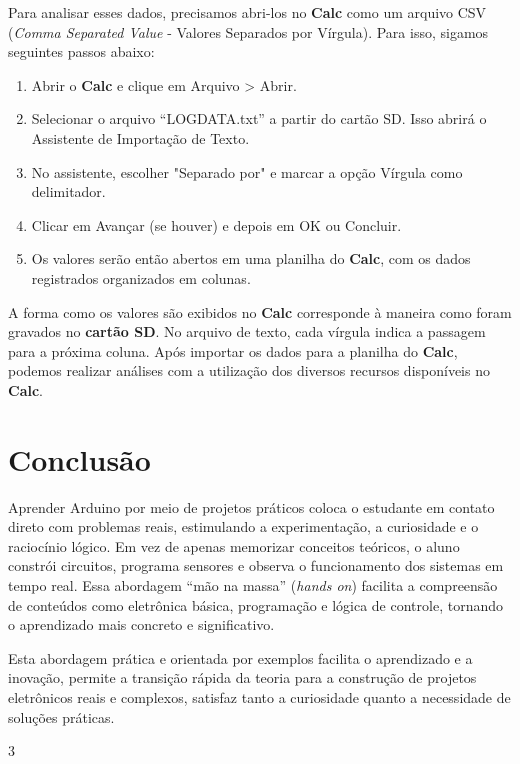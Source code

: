 \documentclass[a4paper,11pt]{article}
\begin{document}
Para analisar esses dados, precisamos abri-los no \textbf{Calc} como um arquivo CSV (\textit{Comma Separated Value} - Valores Separados por Vírgula). Para isso, sigamos seguintes passos abaixo:
\begin{enumerate}
  \item Abrir o \textbf{Calc} e clique em Arquivo > Abrir. 
  \item Selecionar o arquivo “LOGDATA.txt” a partir do cartão SD. Isso abrirá o Assistente de Importação de Texto.
  \item No assistente, escolher "Separado por" e marcar a opção Vírgula como delimitador. 
  \item Clicar em Avançar (se houver) e depois em OK ou Concluir.
  \item Os valores serão então abertos em uma planilha do \textbf{Calc}, com os dados registrados organizados em colunas.
\end{enumerate}

A forma como os valores são exibidos no \textbf{Calc} corresponde à maneira como foram gravados no \textbf{cartão SD}. No arquivo de texto, cada vírgula indica a passagem para a próxima coluna. Após importar os dados para a planilha do \textbf{Calc}, podemos realizar análises com a utilização dos diversos recursos disponíveis no \textbf{Calc}.

\section{Conclusão}
Aprender Arduino por meio de projetos práticos coloca o estudante em contato direto com problemas reais, estimulando a experimentação, a curiosidade e o raciocínio lógico. Em vez de apenas memorizar conceitos teóricos, o aluno constrói circuitos, programa sensores e observa o funcionamento dos sistemas em tempo real. Essa abordagem “mão na massa” (\textit{hands on}) facilita a compreensão de conteúdos como eletrônica básica, programação e lógica de controle, tornando o aprendizado mais concreto e significativo.

Esta abordagem prática e orientada por exemplos facilita o aprendizado e a inovação, permite a transição rápida da teoria para a construção de projetos eletrônicos reais e complexos, satisfaz tanto a curiosidade quanto a necessidade de soluções práticas.



\begin{thebibliography}{3}
  
\end{thebibliography}
  
\end{document}
